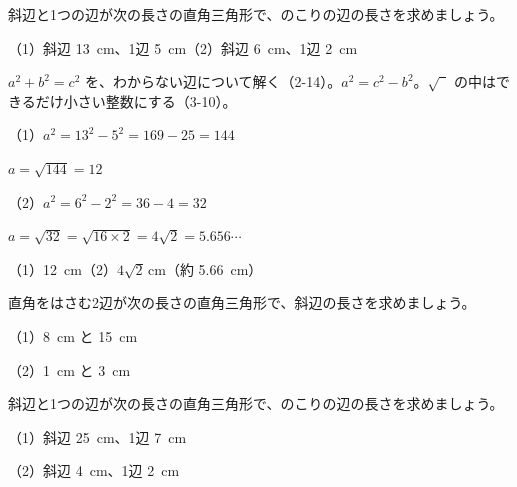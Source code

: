 \begin{reidai}[直角をはさむ辺を求める]
斜辺と1つの辺が次の長さの直角三角形で、のこりの辺の長さを求めましょう。\par
（1）斜辺 \qty{13}{cm}、1辺 \qty{5}{cm}\quad（2）斜辺 \qty{6}{cm}、1辺 \qty{2}{cm}\par
\kangaekata $a^2+b^2=c^2$ を、わからない辺について解く（2-14）。$a^2=c^2-b^2$。$\sqrt{\phantom{2}}$ の中はできるだけ小さい整数にする（3-10）。\par
\shiki（1）$a^2=13^2-5^2=169-25=144$\par
\hspace*{4.6\zw}$a=\sqrt{144}=12$\par
\hspace*{2.6\zw}（2）$a^2=6^2-2^2=36-4=32$\par
\hspace*{4.6\zw}$a=\sqrt{32}=\sqrt{16\times2}=4\sqrt2=5.656\cdots$\par
\kotae（1）\qty{12}{cm}\quad（2）$4\sqrt2$\,cm（約 \qty{5.66}{cm}）
\end{reidai}

\noindent\begin{minipage}[t]{0.485\linewidth}\vspace{0pt}\raggedright
\begin{jibun}\raggedright
直角をはさむ2辺が次の長さの直角三角形で、斜辺の長さを求めましょう。\par（1）\qty{8}{cm} と \qty{15}{cm}\par（2）\qty{1}{cm} と \qty{3}{cm}
\end{jibun}
\end{minipage}\hfill
\begin{minipage}[t]{0.485\linewidth}\vspace{0pt}\raggedright
\begin{jibun}\raggedright
斜辺と1つの辺が次の長さの直角三角形で、のこりの辺の長さを求めましょう。\par
（1）斜辺 \qty{25}{cm}、1辺 \qty{7}{cm}\par（2）斜辺 \qty{4}{cm}、1辺 \qty{2}{cm}
\end{jibun}
\end{minipage}


